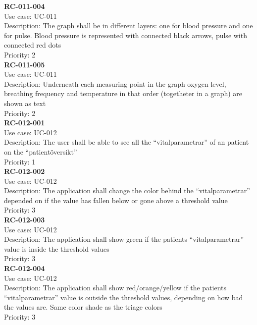 \newline
\textbf{RC-011-004} \\
Use case: UC-011 \\
Description: The graph shall be in different layers: one for blood pressure and one for pulse. Blood pressure is represented with connected black arrows, pulse with connected red dots \\
Priority: 2 \\
\newline
\textbf{RC-011-005} \\
Use case: UC-011 \\
Description: Underneath each measuring point in the graph oxygen level, breathing frequency and temperature in that order (togetheter in a graph) are shown as text\\
Priority: 2 \\
\newline
\textbf{RC-012-001} \\
Use case: UC-012 \\
Description: The user shall be able to see all the “vitalparametrar” of an patient on the “patientöversikt”  \\
Priority: 1 \\
\newline
\textbf{RC-012-002} \\
Use case: UC-012 \\
Description: The application shall change the color behind the “vitalparametrar” depended on if the value has fallen below or gone above a threshold value  \\
Priority: 3 \\
\newline
\textbf{RC-012-003} \\
Use case: UC-012 \\
Description: The application shall show green if the patients “vitalparametrar” value is inside the threshold values \\
Priority: 3 \\
\newline
\textbf{RC-012-004} \\
Use case: UC-012 \\
Description: The application shall show red/orange/yellow if the patients “vitalparametrar” value is outside the threshold values, depending on how bad the values are. Same color shade as the triage colors \\
Priority: 3 \\
\newline
